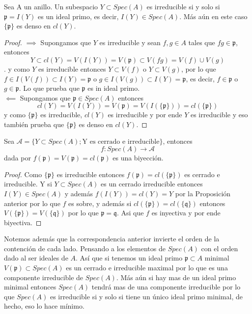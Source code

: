 \documentclass[14pt]{extarticle}
\begin{document}
\begin{proposicion}{}{}
    Sea A un anillo. Un subespacio $Y \subset Spec(A)$
    es irreducible si y solo si $\mathfrak{p} = I(Y)$
    es un ideal primo, es decir, $I(Y) \in Spec(A)$.
    Más aún en este caso $\{\mathfrak{p}\}$ es denso en 
    $cl(Y)$.
\end{proposicion}
\begin{proof}
    $\implies$ Supongamos que $Y$ es irreducible y sean 
    $f,g \in A$ tales que $fg \in \mathfrak{p}$, entonces
    $$Y \subset cl(Y) = V(I(Y)) = V(\mathfrak{p}) \subset V(fg) = V(f) \cup V(g)$$.
    y como $Y$ es irreducible entonces $Y \subset V(f)$ o $Y \subset V(g)$,
    por lo que $f \in I(V(f)) \subset I(Y) = \mathfrak{p}$
    o $g \in I(V(g)) \subset I(Y) = \mathfrak{p}$, es decir,
    $f \in \mathfrak{p}$ o $g \in \mathfrak{p}$. Lo que prueba
    que $\mathfrak{p}$ es in ideal primo.\\
    $\impliedby$ Supongamos que $\mathfrak{p} \in Spec(A)$
    entonces 
    $$cl(Y) = V(I(Y)) = V(\mathfrak{p}) = V(I(\{\mathfrak{p}\})) = cl(\{\mathfrak{p}\})$$
    y como $\{\mathfrak{p}\}$ es irreducible, $cl(Y)$ es irreducible y por ende
    $Y$ es irreducible y eso también prueba que $\{\mathfrak{p}\}$
    es denso en $cl(Y)$.
\end{proof}

\begin{corolario}{}{}
    Sea $\mathcal{A} = \{Y\subset Spec(A); \mbox{Y es cerrado e irreducible}\}$,
    entonces 
    $$f:Spec(A) \rightarrow \mathcal{A}$$ 
    dada por $f(\mathfrak{p}) = V(\mathfrak{p}) = cl(\mathfrak{p})$ es una biyección.
\end{corolario}
\begin{proof}
    Como $\{\mathfrak{p}\}$ es irreducible entonces
    $f(\mathfrak{p}) = cl(\{\mathfrak{p}\})$ es cerrado e irreducible.
    Y si $Y \subset Spec(A)$ es un cerrado irreducible entonces
    $I(Y) \in Spec(A)$ y además $f(I(Y)) = cl(Y) = Y$ por la Proposición anterior
    por lo que $f$ es sobre, y además si $cl(\{\mathfrak{p}\}) = cl(\{\mathfrak{q}\})$
    entonces $V(\{\mathfrak{p}\}) = V(\{\mathfrak{q}\})$ por lo que $\mathfrak{p} = \mathfrak{q}$.
    Asi que $f$ es inyectiva y por ende biyectiva.
\end{proof}

Notemos además que la correspondencia anterior
invierte el orden de la contención de cada lado.
Pensando a los elementos de $Spec(A)$ con el orden 
dado al ser ideales de $A$. Así que si tenemos un
ideal primo $\mathfrak{p} \subset A$ minimal 
$V(\mathfrak{p}) \subset Spec(A)$ es  un cerrado e 
irreducible maximal por lo que es una componente irreducible 
de $Spec(A)$. Más aún si hay mas de un ideal primo minimal
entonces $Spec(A)$ tendrá mas de una componente irreducible
por lo que $Spec(A)$ es irreducible si y solo si tiene un único
ideal primo minimal, de hecho, eso lo hace mínimo.
\end{document}
